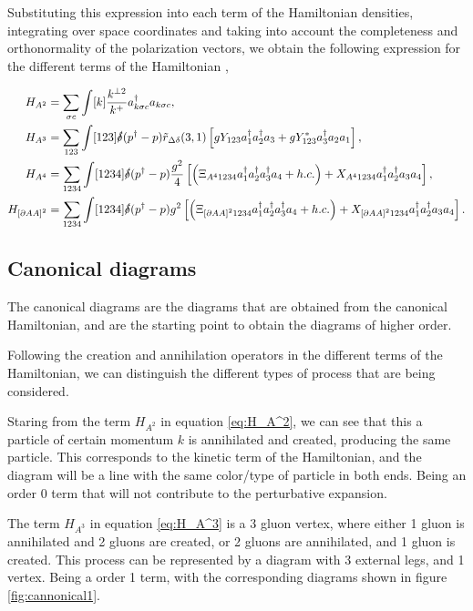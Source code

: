 \documentclass[11pt,a4paper,twoside,pdf]{article}
\numberwithin{equation}{section}
\begin{document}
Substituting this expression into each term of the Hamiltonian densities, integrating
over space coordinates and taking into account the completeness and orthonormality 
of the polarization vectors, we obtain the following expression for the different
terms of the Hamiltonian \cite{QCDG}, 

\begin{align}
    H_{A^2} &= \sum_{\sigma c} \int [k] \frac{k^{\perp 2}}{k^+}a^\dagger_{k\sigma c}
    a_{k\sigma c}, \label{eq:H_A^2}\\
    H_{A^3} &= \sum_{123} \int [123] \slashed{\delta}(p^\dagger - p) \tilde{r}_{\Delta \delta}
    (3, 1) \left[ gY_{123}a_1^\dagger a_2^\dagger a_3 + gY_{123}^*a_3^\dagger a_2 a_1 \right],
    \label{eq:H_A^3}\\
    H_{A^4} &= \sum_{1234} \int [1234] \slashed{\delta}(p^\dagger - p) \frac{g^2}{4}
    \left[ \left( \Xi_{A^4 1234} a_1^\dagger a_2^\dagger a_3^\dagger a_4 + h.c. \right)+ X_{A^4 1234} 
    a_1^\dagger a_2^\dagger a_3 a_4  \right], \label{eq:H_A^4}\\
    H_{\left[ \partial A A \right]^2} &= \sum_{1234} \int [1234] \slashed{\delta}
    (p^\dagger - p) g^2 \left[ \left( \Xi_{\left[ \partial A A \right]^2 1234}
    a_1^\dagger a_2^\dagger a_3^\dagger a_4 + h.c. \right) + X_{\left[ \partial A A \right]^2 
    1234} a_1^\dagger a_2^\dagger a_3 a_4  \right] \label{eq:H_partial}.
\end{align}

\subsection{Canonical diagrams}
The canonical diagrams are the diagrams that are obtained from the canonical
Hamiltonian, and are the starting point to obtain the diagrams of higher order.

Following the creation and annihilation operators in the different terms of the 
Hamiltonian, we can distinguish the different types of process that are being
considered. 

Staring from the term $H_{A^2}$ in equation \eqref{eq:H_A^2}, we can see that this 
a particle of certain momentum $k$ is annihilated and created, producing the same
particle. This corresponds to the kinetic term of the Hamiltonian, and the diagram 
will be a line with the same color/type of particle in both ends. Being an order 0
term that will not contribute to the perturbative expansion.

The term $H_{A^3}$ in equation \eqref{eq:H_A^3} is a 3 gluon vertex, where either
1 gluon is annihilated and 2 gluons are created, or 2 gluons are annihilated, and
1 gluon is created. This process can be represented by a diagram with 3 external
legs, and 1 vertex. Being a order 1 term, with the corresponding diagrams shown in
figure \ref{fig:cannonical1}.
\end{document}
